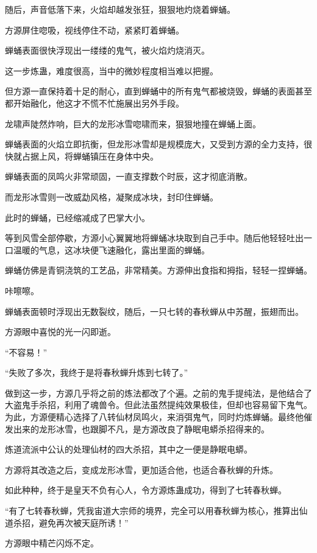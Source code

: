\begin{this_body}
随后，声音低落下来，火焰却越发张狂，狠狠地灼烧着蝉蛹。

方源屏住唿吸，视线停住不动，紧紧盯着蝉蛹。

蝉蛹表面很快浮现出一缕缕的鬼气，被火焰灼烧消灭。

这一步炼蛊，难度很高，当中的微妙程度相当难以把握。

但方源一直保持着十足的耐心，直到蝉蛹中的所有鬼气都被烧毁，蝉蛹的表面甚至都开始融化，他这才不慌不忙施展出另外手段。

龙啸声陡然炸响，巨大的龙形冰雪唿啸而来，狠狠地撞在蝉蛹上面。

蝉蛹表面的火焰立即抗衡，但龙形冰雪却是规模庞大，又受到方源的全力支持，很快就占据上风，将蝉蛹镇压在身体中央。

蝉蛹表面的凤鸣火非常顽固，一直支撑数个时辰，这才彻底消散。

而龙形冰雪则一改威勐风格，凝聚成冰块，封印住蝉蛹。

此时的蝉蛹，已经缩减成了巴掌大小。

等到风雪全部停歇，方源小心翼翼地将蝉蛹冰块取到自己手中。随后他轻轻吐出一口温暖的气息，这冰块便飞速融化，露出里面的蝉蛹。

蝉蛹仿佛是青铜浇筑的工艺品，非常精美。方源伸出食指和拇指，轻轻一捏蝉蛹。

咔嚓嚓。

蝉蛹表面顿时浮现出无数裂纹，随后，一只七转的春秋蝉从中苏醒，振翅而出。

方源眼中喜悦的光一闪即逝。

“不容易！”

“失败了多次，我终于是将春秋蝉升炼到七转了。”

做到这一步，方源几乎将之前的炼法都改了个遍。之前的鬼手提纯法，是他结合了大盗鬼手杀招，利用了魂兽令。但此法虽然提纯效果极佳，但却也容易留下鬼气。为此，方源便精心选择了八转仙材凤鸣火，来消弭鬼气，同时灼炼蝉蛹。最终他催发出来的龙形冰雪，也跟脚不凡，是方源改良了静眠电蟒杀招得来的。

炼道流派中公认的处理仙材的四大杀招，其中之一便是静眠电蟒。

方源将其改造之后，变成龙形冰雪，更加适合他，也适合春秋蝉的升炼。

如此种种，终于是皇天不负有心人，令方源炼蛊成功，得到了七转春秋蝉。

“有了七转春秋蝉，凭我宙道大宗师的境界，完全可以用春秋蝉为核心，推算出仙道杀招，避免再次被天庭所诱！”

方源眼中精芒闪烁不定。


\end{this_body}
